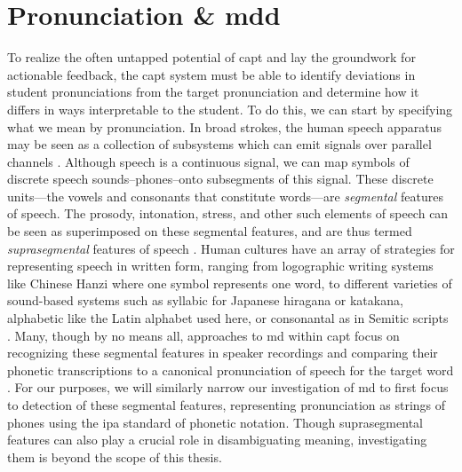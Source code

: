 \documentclass[thesis]{cluu}
\begin{document}
\section{Pronunciation \& \acrfull{mdd}} \label{mdd}
To realize the often untapped potential of \gls{capt} and lay the groundwork for actionable feedback, the \gls{capt} system must be able to identify deviations in student pronunciations from the target pronunciation and determine how it differs in ways interpretable to the student. To do this, we can start by specifying what we mean by pronunciation. In broad strokes, the human speech apparatus may be seen as a collection of subsystems which can emit signals over parallel channels \parencite[p. 173]{engstrandFonetikensGrunder2004}. Although speech is a continuous signal, we can map symbols of discrete speech sounds--phones--onto subsegments of this signal. These discrete units---the vowels and consonants that constitute words---are \textit{segmental} features of speech. The prosody, intonation, stress, and other such elements of speech can be seen as superimposed on these segmental features, and are thus termed \textit{suprasegmental} features of speech \parencite{engstrandFonetikensGrunder2004}. Human cultures have an array of strategies for representing speech in written form, ranging from logographic writing systems like Chinese Hanzi where one symbol represents one word, to different varieties of sound-based systems such as syllabic for Japanese hiragana or katakana, alphabetic like the Latin alphabet used here, or consonantal as in Semitic scripts \parencite{jurafskySpeechLanguageProcessing2025}. Many, though by no means all, approaches to \gls{md} within \gls{capt} focus on recognizing these segmental features in speaker recordings and comparing their phonetic transcriptions to a canonical pronunciation of speech for the target word \parencite{korzekwaComputerassistedPronunciationTraining2022}. For our purposes, we will similarly narrow our investigation of \gls{md} to first focus to detection of these segmental features, representing pronunciation as strings of phones using the \gls{ipa} standard of phonetic notation. Though suprasegmental features can also play a crucial role in disambiguating meaning, investigating them is beyond the scope of this thesis.
\end{document}
